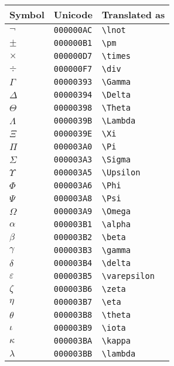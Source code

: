 \begin{longtable}{|l|l|l|}
\hline
Symbol & Unicode & Translated as \\
\endhead
\hline
$\lnot$ & \texttt{000000AC} & \verb|\lnot| \\
\hline
$\pm$ & \texttt{000000B1} & \verb|\pm| \\
\hline
$\times$ & \texttt{000000D7} & \verb|\times| \\
\hline
$\div$ & \texttt{000000F7} & \verb|\div| \\
\hline
$\Gamma$ & \texttt{00000393} & \verb|\Gamma| \\
\hline
$\Delta$ & \texttt{00000394} & \verb|\Delta| \\
\hline
$\Theta$ & \texttt{00000398} & \verb|\Theta| \\
\hline
$\Lambda$ & \texttt{0000039B} & \verb|\Lambda| \\
\hline
$\Xi$ & \texttt{0000039E} & \verb|\Xi| \\
\hline
$\Pi$ & \texttt{000003A0} & \verb|\Pi| \\
\hline
$\Sigma$ & \texttt{000003A3} & \verb|\Sigma| \\
\hline
$\Upsilon$ & \texttt{000003A5} & \verb|\Upsilon| \\
\hline
$\Phi$ & \texttt{000003A6} & \verb|\Phi| \\
\hline
$\Psi$ & \texttt{000003A8} & \verb|\Psi| \\
\hline
$\Omega$ & \texttt{000003A9} & \verb|\Omega| \\
\hline
$\alpha$ & \texttt{000003B1} & \verb|\alpha| \\
\hline
$\beta$ & \texttt{000003B2} & \verb|\beta| \\
\hline
$\gamma$ & \texttt{000003B3} & \verb|\gamma| \\
\hline
$\delta$ & \texttt{000003B4} & \verb|\delta| \\
\hline
$\varepsilon$ & \texttt{000003B5} & \verb|\varepsilon| \\
\hline
$\zeta$ & \texttt{000003B6} & \verb|\zeta| \\
\hline
$\eta$ & \texttt{000003B7} & \verb|\eta| \\
\hline
$\theta$ & \texttt{000003B8} & \verb|\theta| \\
\hline
$\iota$ & \texttt{000003B9} & \verb|\iota| \\
\hline
$\kappa$ & \texttt{000003BA} & \verb|\kappa| \\
\hline
$\lambda$ & \texttt{000003BB} & \verb|\lambda| \\

\end{longtable}

